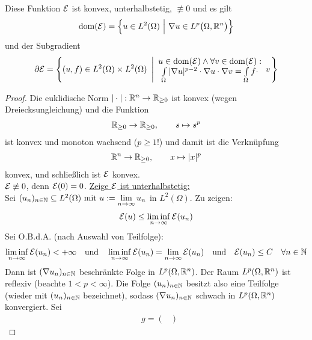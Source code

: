 \begin{beispiel}
\begin{lemma} %
Diese Funktion $\mathcal{E}$ ist konvex, unterhalbstetig, $\not\equiv0$ und es gilt
\begin{align*}
\text{dom}(\mathcal{E})=\Big\lbrace u\in L^2(\Omega)~\Big|~\nabla u\in L^p\big(\Omega,\mathbb{R}^n\big)\Big\rbrace
\end{align*}
und der Subgradient
\begin{align*}
\partial\mathcal{E}=\left\lbrace(u,f)\in L^2(\Omega)\times L^2(\Omega)~\left|
\begin{array}{c}
u\in\text{dom}(\mathcal{E})\wedge\forall v\in\text{dom}(\mathcal{E}):\\
\int\limits_\Omega|\nabla u|^{p-2}\cdot\nabla u\cdot\nabla v=\int\limits_\Omega f\cdot 
\end{array}
v\right.\right\rbrace
\end{align*}
\end{lemma}
\begin{proof}
Die euklidische Norm $|\cdot|:\mathbb{R}^n\to\mathbb{R}_{\geq0}$ ist konvex (wegen Dreiecksungleichung) und die Funktion
\begin{align*}
\mathbb{R}_{\geq0}\to\mathbb{R}_{\geq0},\qquad s\mapsto s^p
\end{align*}
ist konvex und monoton wachsend ($p\geq1$!) und damit ist die Verknüpfung
\begin{align*}
\mathbb{R}^n\to\mathbb{R}_{\geq0},\qquad x\mapsto |x|^p
\end{align*}
konvex, und schließlich ist $\mathcal{E}$ konvex.\\
$\mathcal{E}\not\equiv0$, denn $\mathcal{E}(0)=0$.\nl
\underline{Zeige $\mathcal{E}$ ist unterhalbstetig:}\\
Sei $(u_n)_{n\in\mathbb{N}}\subseteq L^2(\Omega)\text{ mit } u:=\lim\limits_{n\to\infty} u_n$ in $L^2(\Omega)$. Zu zeigen:
\begin{align*}
\mathcal{E}(u)\leq\liminf\limits_{n\to\infty}\mathcal{E}(u_n)
\end{align*}
Sei O.B.d.A. (nach Auswahl von Teilfolge):
\begin{align*}
\liminf\limits_{n\to\infty}\mathcal{E}(u_n)<+\infty
\quad\text{und}\quad
\liminf\limits_{n\to\infty}\mathcal{E}(u_n)=\lim\limits_{n\to\infty}\mathcal{E}(u_n)
\quad\text{und}\quad
\mathcal{E}(u_n)\leq C\quad\forall n\in\mathbb{N}
\end{align*}
Dann ist $(\nabla u_n)_{n\in\mathbb{N}}$ beschränkte Folge in $L^p(\Omega,\mathbb{R}^n)$. Der Raum $L^p(\Omega,\mathbb{R}^n)$ ist reflexiv (beachte $1<p<\infty$). Die Folge $(u_n)_{n\in\mathbb{N}}$ besitzt also eine Teilfolge (wieder mit $(u_n)_{n\in\mathbb{N}}$ bezeichnet), sodass $(\nabla u_n)_{n\in\mathbb{N}}$ schwach in $L^p(\Omega,\mathbb{R}^n)$ konvergiert. Sei
\begin{align*}
&g=\begin{pmatrix}

\end{pmatrix}
\end{align*}
\end{proof}
\end{beispiel}
